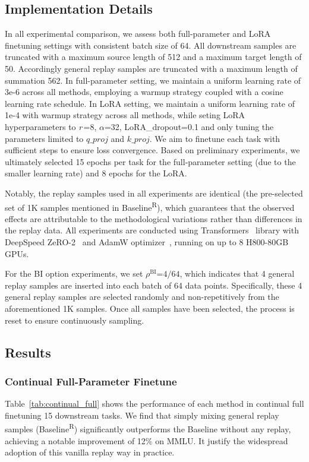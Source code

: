 

\subsection{Implementation Details}
In all experimental comparison, we assess both full-parameter and LoRA finetuning settings with consistent batch size of 64.
All downstream samples are truncated with a maximum source length of 512 and a maximum target length of 50. Accordingly general replay samples are truncated with a maximum length of summation 562.
In full-parameter setting, we maintain a uniform learning rate of 3e-6 across all methods, employing a warmup strategy coupled with a cosine learning rate schedule.
In LoRA setting, we maintain a uniform learning rate of 1e-4 with warmup strategy across all methods, while seting LoRA hyperparameters to \textit{r}\,=8, \ensuremath{\alpha}=32, LoRA\_dropout=0.1 and only tuning the parameters limited to $q\_proj$ and $k\_proj$.
We aim to finetune each task with sufficient steps to ensure loss convergence. Based on preliminary experiments, we ultimately selected 15 epochs per task for the full-parameter setting (due to the smaller learning rate) and 8 epochs for the LoRA.

Notably, the replay samples used in all experiments are identical (the pre-selected set of 1K samples mentioned in Baseline\textsuperscript{R}), which guarantees that the observed effects are attributable to the methodological variations rather than differences in the replay data.
All experiments are conducted using Transformers~\cite{wolf2020transformers} library with DeepSpeed ZeRO-2~\cite{rajbhandari2020zero} and AdamW optimizer~\cite{loshchilov2017decoupled}, running on up to 8 H800-80GB GPUs.

For the BI option experiments, we set $\rho^{\text{BI}}$=$4/64$, which indicates that 4 general replay samples are inserted into each batch of 64 data points. Specifically, these 4 general replay samples are selected randomly and non-repetitively from the aforementioned 1K samples. Once all samples have been selected, the process is reset to ensure continuously sampling.

\subsection{Results}

\subsubsection{Continual Full-Parameter Finetune}
Table~\ref{tab:continual_full} shows the performance of each method in continual full finetuning 15 downstream tasks.
We find that simply mixing general replay samples (Baseline\textsuperscript{R}) significantly outperforms the Baseline without any replay, achieving a notable improvement of 12\% on MMLU. It justify the widespread adoption of this vanilla replay way in practice.

